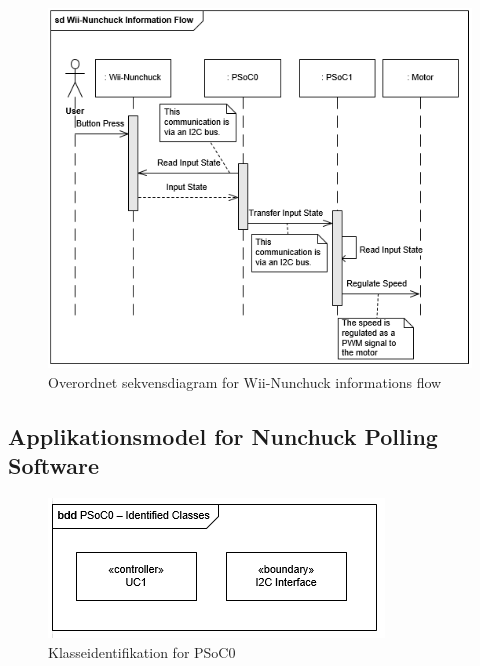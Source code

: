 \begin{figure}[H]
	\centering
	\includegraphics[width=\textwidth]{Systemarkitektur/images/WiiNunchuckSequenceDiagram.png}
	\caption{Overordnet sekvensdiagram for Wii-Nunchuck informations flow}
	\label{fig:WiiNunchuckSequenceDiagram}
\end{figure}

\subsection{Applikationsmodel for Nunchuck Polling Software}

\begin{figure}[H]
	\centering
	\includegraphics[scale=0.8]{Systemarkitektur/images/klasseIdentificationUC1PSoC0}
	\caption{Klasseidentifikation for PSoC0}
	\label{fig:klasseidentifikationUC1PSoC0}
\end{figure}

